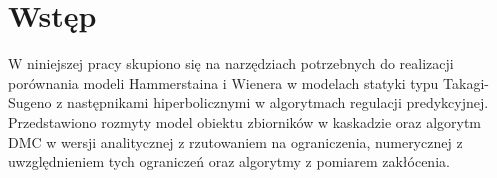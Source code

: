 \chapter{Wstęp}
W niniejszej pracy skupiono się na narzędziach potrzebnych do realizacji porównania modeli Hammerstaina i Wienera w modelach statyki typu Takagi-Sugeno z następnikami hiperbolicznymi w algorytmach regulacji predykcyjnej. Przedstawiono rozmyty model obiektu zbiorników w kaskadzie oraz algorytm DMC w wersji analitycznej z rzutowaniem na ograniczenia, numerycznej z uwzględnieniem tych ograniczeń oraz algorytmy z pomiarem zakłócenia.